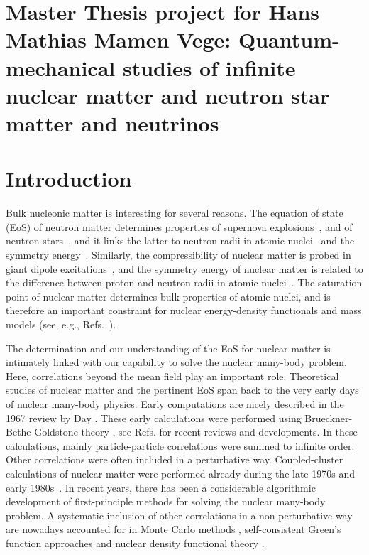 \documentclass[aps,prc,twocolumn,showpacs,floatfix,nofootinbib,preprintnumbers,superscriptaddress,amsmath,amssymb]{revtex4-1}
\begin{document}
\pagestyle{plain}

\section*{Master Thesis project for Hans Mathias Mamen Vege: Quantum-mechanical studies of infinite nuclear matter and neutron star matter and neutrinos}


\section{Introduction}

Bulk nucleonic matter is interesting for several reasons. The equation of state (EoS) of
neutron matter determines properties of supernova
explosions~\cite{burrows2013}, and of neutron
stars~\cite{weber1999,hh2000,lattimer2007,sammarruca2010,lattimer2012,hebeler2012f},
and it links the latter to neutron radii in atomic
nuclei~\cite{brown2000,horowitz2001,gandolfi2012} and the symmetry
energy~\cite{tsang2012,steiner2012}. Similarly, the compressibility of
nuclear matter is probed in giant dipole
excitations~\cite{shlomo1993}, and the symmetry energy of nuclear
matter is related to the difference between proton and neutron radii
in atomic nuclei~\cite{abrahamyan2012,reinhard2013,erler2013}. The
saturation point of nuclear matter determines bulk properties of
atomic nuclei, and is therefore an important constraint for nuclear
energy-density functionals and mass models (see,
e.g., Refs.~\cite{kortelainen2010,lunney2003}).

The determination and our understanding of the EoS for nuclear matter
is intimately linked with our capability to solve the nuclear
many-body problem. Here, correlations beyond the mean field play an
important role.  Theoretical studies of nuclear matter and the
pertinent EoS span back to the very early days of nuclear many-body
physics. Early computations are nicely described in the 1967 review by
Day \cite{day1967}. These early calculations were performed using
Brueckner-Bethe-Goldstone theory \cite{brueckner1954,brueckner1955},
see Refs.\cite{hh2000,baldo2012,baldo2012a,baardsen2014} for recent reviews and
developments.  In these calculations, mainly particle-particle
correlations were summed to infinite order.  Other correlations were
often included in a perturbative way. Coupled-cluster calculations of
nuclear matter were performed already during the late 1970s and early
1980s~\cite{kummel1978,day1981}. In recent years, there has been a
considerable algorithmic development of first-principle methods for
solving the nuclear many-body problem. A systematic inclusion of other
correlations in a non-perturbative way are nowadays accounted for in
Monte Carlo methods
\cite{carlson2003,gandolfi2009,gezerlis2010,lovato2012,gezerlis2013},
self-consistent Green's function approaches
\cite{dickhoff2004,soma2008, soma2012, baldo2012a,carbone2013} and
nuclear density functional theory \cite{lunney2003,erler2013}.
\end{document}
